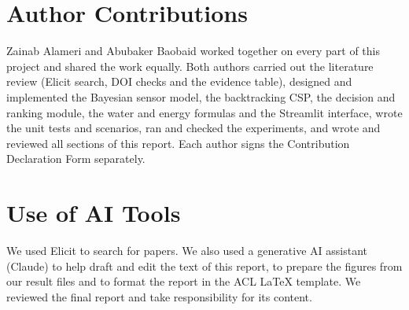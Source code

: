 \documentclass[11pt]{article}
\begin{document}
\newpage
\section*{Author Contributions}
Zainab Alameri and Abubaker Baobaid worked together on every part of this project and shared the work equally. Both authors carried out the literature review (Elicit search, DOI checks and the evidence table), designed and implemented the Bayesian sensor model, the backtracking CSP, the decision and ranking module, the water and energy formulas and the Streamlit interface, wrote the unit tests and scenarios, ran and checked the experiments, and wrote and reviewed all sections of this report. Each author signs the Contribution Declaration Form separately.

\section*{Use of AI Tools}
We used Elicit to search for papers. We also used a generative AI assistant (Claude) to help draft and edit the text of this report, to prepare the figures from our result files and to format the report in the ACL \LaTeX{} template. We reviewed the final report and take responsibility for its content.


\end{document}
